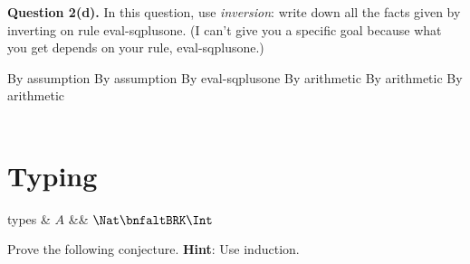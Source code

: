 \textbf{Question 2(d).}
In this question, use \emph{inversion}: write down all the facts given by inverting
on rule eval-sqplusone.  (I can't give you a specific goal because what you get depends on your rule, eval-sqplusone.)

\begin{llproof}
    {By assumption}
    {By assumption}
    {By eval-sqplusone}
    {By arithmetic}
    {By arithmetic}
    {By arithmetic}
  \Pf{}{}{\hspace*{150pt}}  {}
~\\
~\\
\end{llproof}



\clearpage

\section{Typing}

\begin{grammar}
  types & $A$ &\bnfas& $\Nat \bnfaltBRK \Int$
\end{grammar}


\medskip

Prove the following conjecture.
\textbf{Hint}: Use induction.

